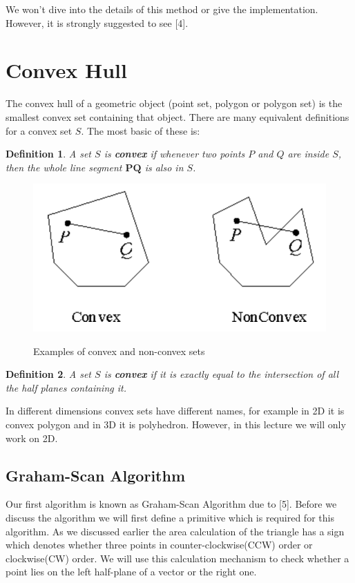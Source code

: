 \documentclass[12pt]{article}
\newtheorem{defn}{Definition}[section]
\begin{document}
We won't dive into the details of this method or give the implementation. However,
it is strongly suggested to see [4].

\section{Convex Hull}
The convex hull of a geometric object (point set, polygon or polygon set) is the
smallest convex set containing that object. There are many equivalent definitions 
for a convex set $S$. The most basic of these is:

\begin{defn}
  A set $S$ is \textbf{convex} if whenever two points $P$ and $Q$ are inside $S$, then the 
  whole line segment $\pmb{PQ}$ is also in $S$.
\end{defn}

\begin{center}
  \begin{figure}[!htb]
    \centering
    \includegraphics[width=.5\linewidth]{figures/fig13.png}
    \label{fig:14}
    \caption{Examples of convex and non-convex sets}
  \end{figure}
\end{center}

\begin{defn}
  A set $S$ is \textbf{convex} if it is exactly equal to the intersection of all the
  half planes containing it.
\end{defn}

In different dimensions convex sets have different names, for example in 2D it is
convex polygon and in 3D it is polyhedron. However, in this lecture we will only 
work on 2D.

\subsection{Graham-Scan Algorithm}

Our first algorithm is known as Graham-Scan Algorithm due to [5]. Before we discuss the algorithm we will first define a primitive which is required
for this algorithm. As we discussed earlier the area calculation of the triangle has a sign which denotes whether three points in counter-clockwise(CCW) order or clockwise(CW) order. We will use this calculation mechanism to check whether a point lies on the left half-plane of a vector or the right one.
\end{document}
